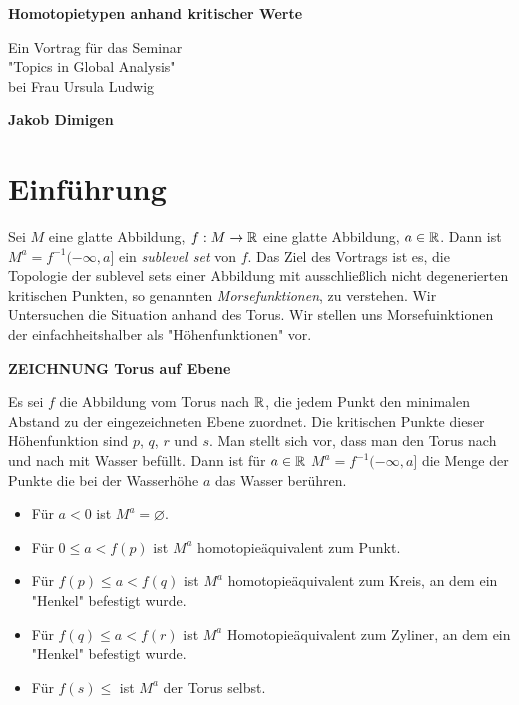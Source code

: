 \documentclass[a4paper,11pt]{article}
\begin{document}
\begin{titlepage}
    \begin{center}
        \vspace*{1cm}
 
        \Large{\textbf{Homotopietypen anhand kritischer Werte}}
 
        \vspace{0.5cm}
        Ein Vortrag für das Seminar \\ 
        "Topics in Global Analysis" \\
        bei Frau Ursula Ludwig
             
        \vspace{1.5cm}
 
        \textbf{Jakob Dimigen}
             
    \end{center}
\end{titlepage}

\section{Einführung}

Sei $M$ eine glatte Abbildung, $f: M \to { \mathbb R }$ eine glatte Abbildung, 
$a \in { \mathbb R }$. Dann ist $M^a = f^{-1}(- \infty, a]$ ein \textit{sublevel set} von 
$f$. Das Ziel des Vortrags ist es, die Topologie der sublevel sets einer 
Abbildung mit ausschließlich nicht degenerierten kritischen Punkten, so genannten
\textit{Morsefunktionen}, zu verstehen.
Wir Untersuchen die Situation anhand des Torus. Wir stellen uns Morsefuinktionen
der einfachheitshalber als "Höhenfunktionen" vor.

\textbf{ZEICHNUNG Torus auf Ebene}

Es sei $f$ die Abbildung vom Torus nach ${ \mathbb R }$, die jedem Punkt den minimalen
Abstand zu der eingezeichneten Ebene zuordnet. 
Die kritischen Punkte dieser Höhenfunktion sind $p$, $q$, $r$ und $s$.
Man stellt sich vor, dass man den Torus nach und nach mit Wasser befüllt. Dann 
ist für $a \in { \mathbb R }$ $M^a = f^{-1}(-\infty, a]$ die Menge der Punkte die bei der
Wasserhöhe $a$ das Wasser berühren. 

\begin{itemize}
    \item Für $a < 0$ ist $M^a = \varnothing$.
    \item Für $0 \leq a < f(p)$ ist $M^a$ homotopieäquivalent zum Punkt.
    \item Für $f(p) \leq a < f(q)$ ist $M^a$ homotopieäquivalent zum Kreis,
        an dem ein "Henkel" befestigt wurde.
    \item Für $f(q) \leq a < f(r)$ ist $M^a$ Homotopieäquivalent zum Zyliner,
        an dem ein "Henkel" befestigt wurde.
    \item Für $f(s) \leq$ ist $M^a$ der Torus selbst.
\end{itemize}
\end{document}
